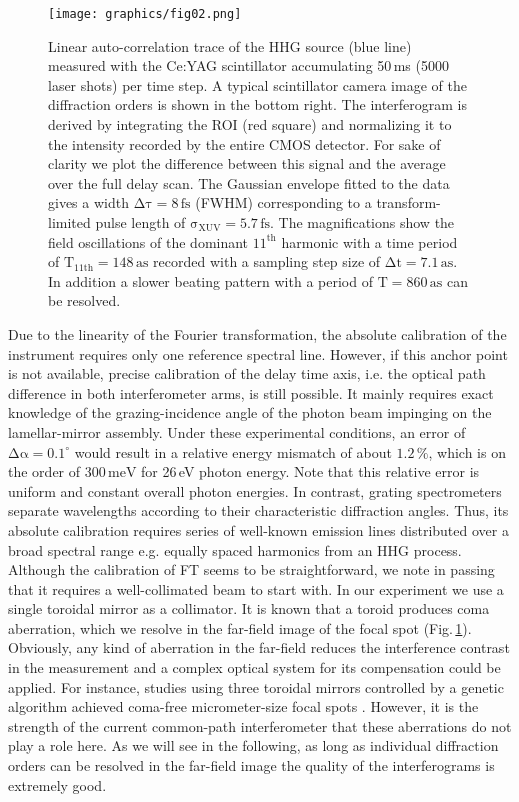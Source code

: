 \documentclass[fleqn,10pt]{wlscirep}
\begin{document}
\begin{figure}[t]
\centering
\texttt{[image: graphics/fig02.png]}
\caption{Linear auto-correlation trace of the HHG source (blue line) measured with the Ce:YAG scintillator accumulating 50\,ms (5000 laser shots) per time step. A typical scintillator camera image of the diffraction orders is shown in the bottom right. The interferogram is derived by integrating the ROI (red square) and normalizing it to the intensity recorded by the entire CMOS detector. For sake of clarity we plot the difference between this signal and the average over the full delay scan. The Gaussian envelope fitted to the data gives a width $\mathrm{\Delta\tau=8\,fs}$ (FWHM) corresponding to a transform-limited pulse length of $\mathrm{\sigma_{XUV}=5.7\,fs}$. The magnifications show the field oscillations of the dominant $\mathrm{11^{th}}$ harmonic with a time period of $\mathrm{T_{11th}=148\,as}$ recorded with a sampling step size of $\mathrm{\Delta t=7.1\,as}$. In addition a slower beating pattern with a period of $\mathrm{T=860\,as}$ can be resolved.}
\label{fig:ACmeasurement}
\end{figure}

Due to the linearity of the Fourier transformation, the absolute calibration of the instrument requires only one reference spectral line. However, if this anchor point is not available, precise calibration of the delay time axis, i.e. the optical path difference in both interferometer arms, is still possible. It mainly requires exact knowledge of the grazing-incidence angle of the photon beam impinging on the lamellar-mirror assembly. Under these experimental conditions, an error of $\mathrm{\Delta\alpha=0.1^{\circ}}$ would result in a relative energy mismatch of about $\mathrm{1.2\,\%}$, which is on the order of $\mathrm{300\,meV}$ for 26\,eV photon energy. Note that this relative error is uniform and constant overall photon energies. In contrast, grating spectrometers separate wavelengths according to their characteristic diffraction angles. Thus, its absolute calibration requires series of well-known emission lines distributed over a broad spectral range e.g. equally spaced harmonics from an HHG process. Although the calibration of FT seems to be straightforward, we note in passing that it requires a well-collimated beam to start with. In our experiment we use a single toroidal mirror as a collimator. It is known that a toroid produces coma aberration, which we resolve in the far-field image of the focal spot (Fig.\,\ref{fig:ACmeasurement}). Obviously, any kind of aberration in the far-field reduces the interference contrast in the measurement and a complex optical system for its compensation could be applied. For instance, studies using three toroidal mirrors controlled by a genetic algorithm achieved coma-free micrometer-size focal spots \cite{Frassetto2014}. However, it is the strength of the current common-path interferometer that these aberrations do not play a role here. As we will see in the following, as long as individual diffraction orders can be resolved in the far-field image the quality of the interferograms is extremely good.    
\end{document}
